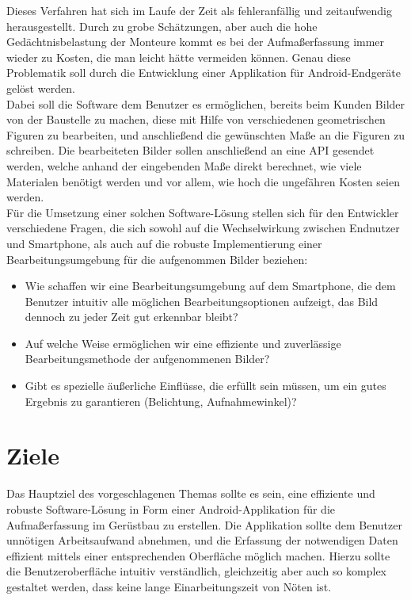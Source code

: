 \documentclass[a4paper]{article}
\begin{document}
Dieses Verfahren hat sich im Laufe der Zeit als fehleranfällig und zeitaufwendig herausgestellt.
Durch zu grobe Schätzungen, aber auch die hohe Gedächtnisbelastung der Monteure kommt es bei der Aufmaßerfassung immer wieder zu Kosten, die man leicht hätte vermeiden können.
Genau diese Problematik soll durch die Entwicklung einer Applikation für Android-Endgeräte gelöst werden. \\

Dabei soll die Software dem Benutzer es ermöglichen, bereits beim Kunden Bilder von der Baustelle zu machen, diese mit Hilfe von verschiedenen geometrischen Figuren zu bearbeiten, und anschließend die gewünschten Maße an die Figuren zu schreiben. 
Die bearbeiteten Bilder sollen anschließend an eine API gesendet werden, welche anhand der eingebenden Maße direkt berechnet, wie viele Materialen benötigt werden und vor allem, wie hoch die ungefähren Kosten seien werden.\\

Für die Umsetzung einer solchen Software-Lösung stellen sich für den Entwickler verschiedene Fragen, die sich sowohl auf die Wechselwirkung zwischen Endnutzer und Smartphone, als auch auf die robuste Implementierung einer Bearbeitungsumgebung für die aufgenommen Bilder beziehen: \\

\begin{itemize}
	\item Wie schaffen wir eine Bearbeitungsumgebung auf dem Smartphone, die dem Benutzer intuitiv alle möglichen Bearbeitungsoptionen aufzeigt, das Bild dennoch zu jeder Zeit gut erkennbar bleibt?
	\item Auf welche Weise ermöglichen wir eine effiziente und zuverlässige Bearbeitungsmethode der aufgenommenen Bilder?
	\item Gibt es spezielle äußerliche Einflüsse, die erfüllt sein müssen, um ein gutes Ergebnis zu garantieren (Belichtung, Aufnahmewinkel)?
\end{itemize}

\newpage

\section*{Ziele}
Das Hauptziel des vorgeschlagenen Themas sollte es sein, eine effiziente und robuste Software-Lösung in Form einer Android-Applikation für die Aufmaßerfassung im Gerüstbau zu erstellen. 
Die Applikation sollte dem Benutzer unnötigen Arbeitsaufwand abnehmen, und die Erfassung der notwendigen Daten effizient mittels einer entsprechenden Oberfläche möglich machen.
Hierzu sollte die Benutzeroberfläche intuitiv verständlich, gleichzeitig aber auch so komplex gestaltet werden, dass keine lange Einarbeitungszeit von Nöten ist.
\end{document}
